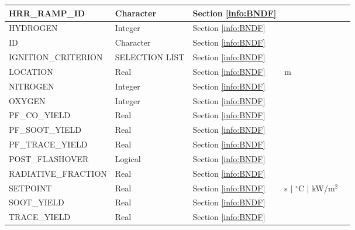 \begin{longtable}{@{\extracolsep{\fill}}|l|l|l|l|l|}
{\ct HRR\_RAMP\_ID}            & Character   & Section \ref{info:BNDF}                 &                             &                 \\ \hline
{\ct HYDROGEN}             & Integer     & Section \ref{info:BNDF}                 &                             &                 \\ \hline
{\ct ID}                   & Character   & Section \ref{info:BNDF}                 &                             &                 \\ \hline
{\ct IGNITION\_CRITERION}  & {\ct SELECTION LIST}        & Section \ref{info:BNDF}                 &                             &                 \\ \hline
{\ct LOCATION}        & Real        & Section \ref{info:BNDF}                 & m                           &                 \\ \hline
{\ct NITROGEN}             & Integer     & Section \ref{info:BNDF}                 &                             &                 \\ \hline
{\ct OXYGEN}               & Integer     & Section \ref{info:BNDF}                 &                             &                 \\ \hline
{\ct PF\_CO\_YIELD}        & Real        & Section \ref{info:BNDF}                 &                             &                 \\ \hline
{\ct PF\_SOOT\_YIELD}      & Real        & Section \ref{info:BNDF}                 &                             &                 \\ \hline
{\ct PF\_TRACE\_YIELD}     & Real        & Section \ref{info:BNDF}                 &                             &                 \\ \hline
{\ct POST\_FLASHOVER}      & Logical     & Section \ref{info:BNDF}                 &                             &                 \\ \hline
{\ct RADIATIVE\_FRACTION}  & Real        & Section \ref{info:BNDF}                 &                             &                 \\ \hline
{\ct SETPOINT}             & Real        & Section \ref{info:BNDF}                 & s $\mid$ $^\circ$C $\mid$ kW/m$^2$  &                 \\ \hline
{\ct SOOT\_YIELD}          & Real        & Section \ref{info:BNDF}                 &                             &                 \\ \hline
{\ct TRACE\_YIELD}         & Real        & Section \ref{info:BNDF}                 &                             &                 \\ \hline
\end{longtable}


